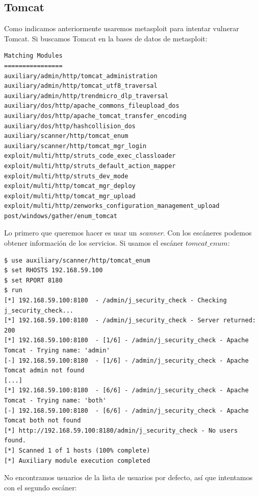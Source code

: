 \documentclass[a4paper,12pt]{scrartcl}
\begin{document}
\subsection{Tomcat}


Como indicamos anteriormente usaremos metasploit para intentar vulnerar Tomcat. Si buscamos Tomcat en la bases de datos de metasploit:

\begin{lstlisting}[breaklines]
Matching Modules
================
auxiliary/admin/http/tomcat_administration
auxiliary/admin/http/tomcat_utf8_traversal
auxiliary/admin/http/trendmicro_dlp_traversal
auxiliary/dos/http/apache_commons_fileupload_dos
auxiliary/dos/http/apache_tomcat_transfer_encoding
auxiliary/dos/http/hashcollision_dos
auxiliary/scanner/http/tomcat_enum
auxiliary/scanner/http/tomcat_mgr_login
exploit/multi/http/struts_code_exec_classloader
exploit/multi/http/struts_default_action_mapper
exploit/multi/http/struts_dev_mode
exploit/multi/http/tomcat_mgr_deploy
exploit/multi/http/tomcat_mgr_upload
exploit/multi/http/zenworks_configuration_management_upload
post/windows/gather/enum_tomcat
\end{lstlisting}

Lo primero que queremos hacer es usar un \textit{scanner}. Con los escáneres podemos obtener información de los servicios. Si usamos el escáner $tomcat\_enum$:


\begin{lstlisting}[breaklines]
$ use auxiliary/scanner/http/tomcat_enum
$ set RHOSTS 192.168.59.100
$ set RPORT 8180
$ run
[*] 192.168.59.100:8180  - /admin/j_security_check - Checking j_security_check...
[*] 192.168.59.100:8180  - /admin/j_security_check - Server returned: 200
[*] 192.168.59.100:8180  - [1/6] - /admin/j_security_check - Apache Tomcat - Trying name: 'admin'
[-] 192.168.59.100:8180  - [1/6] - /admin/j_security_check - Apache Tomcat admin not found
[...]
[*] 192.168.59.100:8180  - [6/6] - /admin/j_security_check - Apache Tomcat - Trying name: 'both'
[-] 192.168.59.100:8180  - [6/6] - /admin/j_security_check - Apache Tomcat both not found
[*] http://192.168.59.100:8180/admin/j_security_check - No users found.
[*] Scanned 1 of 1 hosts (100% complete)
[*] Auxiliary module execution completed
\end{lstlisting}

No encontramos usuarios de la lista de usuarios por defecto, así que intentamos con el segundo escáner:
\end{document}
